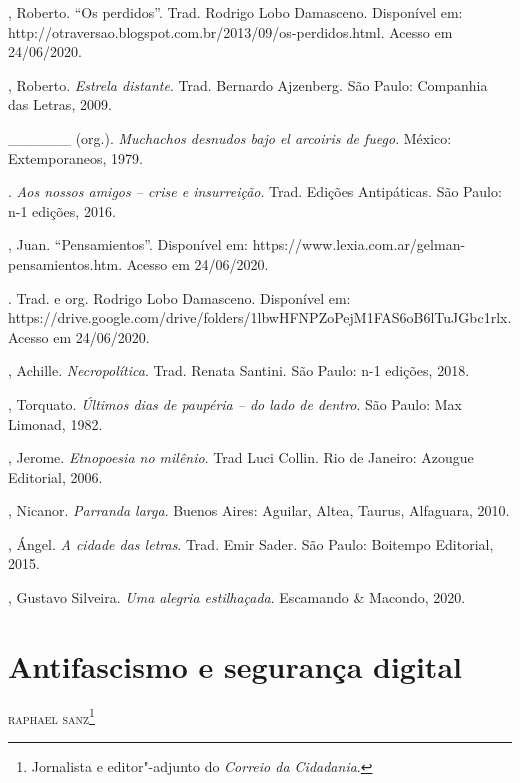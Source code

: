 \begin{Parskip}
, Roberto. ``Os perdidos''. Trad. Rodrigo Lobo Damasceno. Disponível
em: http://otraversao.blogspot.com.br/2013/09/os-perdidos.html. Acesso
em 24/06/2020.

, Roberto. \emph{Estrela distante}. Trad. Bernardo Ajzenberg. São
Paulo: Companhia das Letras, 2009.

\_\_\_\_\_\_ (org.). \emph{Muchachos desnudos bajo el arcoiris de fuego}.
México: Extemporaneos, 1979.

. \emph{Aos nossos amigos -- crise e insurreição}. Trad.
Edições Antipáticas. São Paulo: n-1 edições, 2016.

, Juan. ``Pensamientos''. Disponível em:
https://www.lexia.com.ar/gelman-pensamientos.htm. Acesso em 24/06/2020.

. Trad. e org. Rodrigo Lobo Damasceno. Disponível em:
https://drive.google.com/drive/folders/1lbwHFNPZoPejM1FAS6oB6lTuJGbc1rlx.
Acesso em 24/06/2020.

, Achille. \emph{Necropolítica}. Trad. Renata Santini. São Paulo:
n-1 edições, 2018.

, Torquato. \emph{Últimos dias de paupéria -- do lado de dentro}. São
Paulo: Max Limonad, 1982.

, Jerome. \emph{Etnopoesia no milênio}. Trad Luci Collin. Rio
de Janeiro: Azougue Editorial, 2006.

, Nicanor. \emph{Parranda larga}. Buenos Aires: Aguilar, Altea,
Taurus, Alfaguara, 2010.

, Ángel. \emph{A cidade das letras}. Trad. Emir Sader. São Paulo:
Boitempo Editorial, 2015.

, Gustavo Silveira. \emph{Uma alegria estilhaçada}. Escamando \&
Macondo, 2020.
\end{Parskip}

\chapter[Antifascismo e segurança digital]{Antifascismo e segurança digital}

\hfill{}\textsc{raphael sanz}\footnote{Jornalista e editor"-adjunto do \emph{Correio da Cidadania}.}

\bigskip

